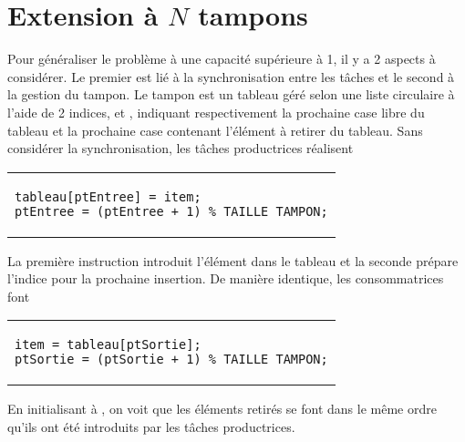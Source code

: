 \section{Extension à $N$ tampons}
Pour généraliser le problème à une capacité supérieure à 1, il y a 2 aspects à considérer. Le premier est lié à la synchronisation entre les tâches et le second à la gestion du tampon.
Le tampon est un tableau géré selon une liste circulaire à l'aide de 2 indices,  et , indiquant respectivement la prochaine case libre du tableau et la prochaine case contenant l'élément à retirer du tableau. Sans considérer la synchronisation, les tâches productrices réalisent
\centering
\vspace{-0.2 cm}
\begin{tabular}{l}
\begin{lstlisting}
tableau[ptEntree] = item;
ptEntree = (ptEntree + 1) % TAILLE_TAMPON;
\end{lstlisting}
\end{tabular}

La première instruction introduit l'élément dans le tableau et la seconde prépare l'indice pour la prochaine insertion. De manière identique, les consommatrices font
\centering
\vspace{-0.2 cm}
\begin{tabular}{l}
\begin{lstlisting}
item = tableau[ptSortie];
ptSortie = (ptSortie + 1) % TAILLE_TAMPON;
\end{lstlisting}
\end{tabular}

En initialisant  à , on voit que les éléments retirés se font dans le même ordre qu'ils ont été introduits par les tâches productrices.

